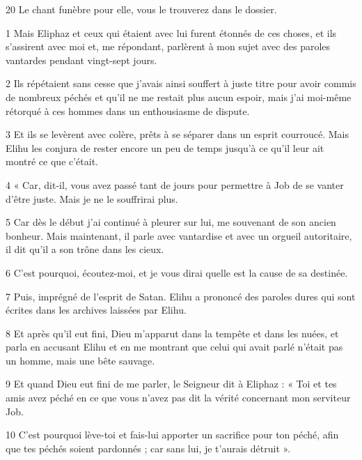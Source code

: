 \par 20 Le chant funèbre pour elle, vous le trouverez dans le dossier.


\par 1 Mais Eliphaz et ceux qui étaient avec lui furent étonnés de ces choses, et ils s'assirent avec moi et, me répondant, parlèrent à mon sujet avec des paroles vantardes pendant vingt-sept jours.

\par 2 Ils répétaient sans cesse que j'avais ainsi souffert à juste titre pour avoir commis de nombreux péchés et qu'il ne me restait plus aucun espoir, mais j'ai moi-même rétorqué à ces hommes dans un enthousiasme de dispute.

\par 3 Et ils se levèrent avec colère, prêts à se séparer dans un esprit courroucé. Mais Elihu les conjura de rester encore un peu de temps jusqu'à ce qu'il leur ait montré ce que c'était.

\par 4 « Car, dit-il, vous avez passé tant de jours pour permettre à Job de se vanter d'être juste. Mais je ne le souffrirai plus.

\par 5 Car dès le début j'ai continué à pleurer sur lui, me souvenant de son ancien bonheur. Mais maintenant, il parle avec vantardise et avec un orgueil autoritaire, il dit qu'il a son trône dans les cieux.

\par 6 C'est pourquoi, écoutez-moi, et je vous dirai quelle est la cause de sa destinée.

\par 7 Puis, imprégné de l'esprit de Satan. Elihu a prononcé des paroles dures qui sont écrites dans les archives laissées par Elihu.

\par 8 Et après qu'il eut fini, Dieu m'apparut dans la tempête et dans les nuées, et parla en accusant Elihu et en me montrant que celui qui avait parlé n'était pas un homme, mais une bête sauvage.

\par 9 Et quand Dieu eut fini de me parler, le Seigneur dit à Eliphaz : « Toi et tes amis avez péché en ce que vous n'avez pas dit la vérité concernant mon serviteur Job.

\par 10 C'est pourquoi lève-toi et fais-lui apporter un sacrifice pour ton péché, afin que tes péchés soient pardonnés ; car sans lui, je t’aurais détruit ».

